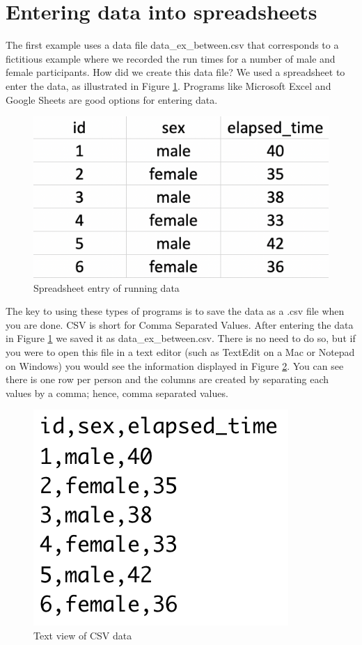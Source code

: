 \documentclass[
]{krantz}
\begin{document}
\hypertarget{entering-data-into-spreadsheets}{%
\section{Entering data into spreadsheets}\label{entering-data-into-spreadsheets}}

The first example uses a data file data\_ex\_between.csv that corresponds to a fictitious example where we recorded the run times for a number of male and female participants. How did we create this data file? We used a spreadsheet to enter the data, as illustrated in Figure \ref{fig:spreadsheetbetween}. Programs like Microsoft Excel and Google Sheets are good options for entering data.

\begin{figure}
\includegraphics[width=0.4\linewidth]{ch_enter_load/images/screenshot_data_between} \caption{Spreadsheet entry of running data}\label{fig:spreadsheetbetween}
\end{figure}

The key to using these types of programs is to save the data as a .csv file when you are done. CSV is short for Comma Separated Values. After entering the data in Figure \ref{fig:spreadsheetbetween} we saved it as data\_ex\_between.csv. There is no need to do so, but if you were to open this file in a text editor (such as TextEdit on a Mac or Notepad on Windows) you would see the information displayed in Figure \ref{fig:csvsheetbetween}. You can see there is one row per person and the columns are created by separating each values by a comma; hence, comma separated values.

\begin{figure}
\includegraphics[width=0.25\linewidth]{ch_enter_load/images/screenshot_csv_between} \caption{Text view of CSV data}\label{fig:csvsheetbetween}
\end{figure}
\end{document}

